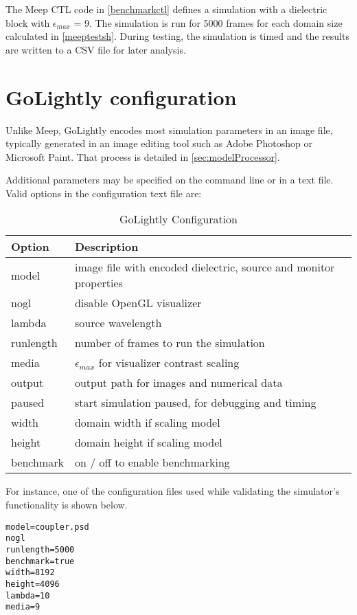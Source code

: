 


The Meep CTL code in \autoref{benchmarkctl} defines a simulation with a dielectric block with $\epsilon_{max}$ = 9. The simulation is run for 5000 frames for each domain size calculated in \autoref{meeptestsh}. During testing, the simulation is timed and the results are written to a CSV file for later analysis. 



\section{GoLightly configuration}

Unlike Meep, GoLightly encodes most simulation parameters in an image file, typically generated in an image editing tool such as Adobe Photoshop or Microsoft Paint. That process is detailed in \autoref{sec:modelProcessor}. 

Additional parameters may be specified on the command line or in a text file. Valid options in the configuration text file are:

\begin{table}[h!]
	\label{golightlyConfig}
	\centering
	\caption{GoLightly Configuration}
	\label{tab:golightlyConfigTerms}
	\begin{tabular}{l | l}
		Option	& Description \\
		\hline
			model     & image file with encoded dielectric, source and monitor properties \\
			nogl      & disable OpenGL visualizer										  \\
			lambda    & source wavelength												  \\
			runlength & number of frames to run the simulation							  \\
			media     & $\epsilon_{max}$  for visualizer contrast scaling								  \\
			output    & output path for images and numerical data						  \\
			paused    & start simulation paused, for debugging and timing				  \\
			width     & domain width if scaling model									  \\
			height    & domain height if scaling model									  \\
			benchmark & on / off to enable benchmarking									  \\
	\end{tabular}
\end{table}

For instance, one of the configuration files used while validating the simulator's functionality is shown below.

\begin{lstlisting}[caption={Samply GoLightly Configuration File},label={listing:sampleGolightlyConfig}]
model=coupler.psd
nogl
runlength=5000
benchmark=true
width=8192
height=4096
lambda=10
media=9
\end{lstlisting}




